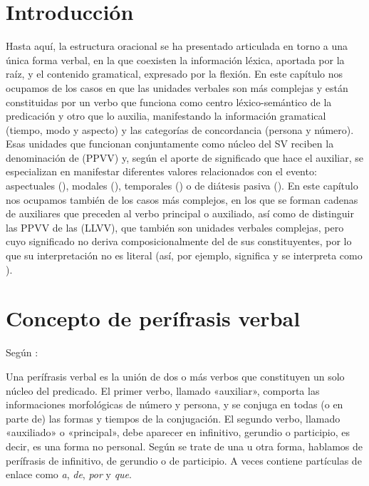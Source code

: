 
\section{Introducción}

Hasta aquí, la estructura oracional se ha presentado articulada en torno a una
única forma verbal, en la que coexisten la información léxica, aportada por la
raíz, y el contenido gramatical, expresado por la flexión. En este capítulo nos
ocupamos de los casos en que las unidades verbales son más complejas y están
constituidas por un verbo que funciona como centro léxico-semántico de la
predicación y otro que lo auxilia, manifestando la información gramatical
(tiempo, modo y aspecto) y las categorías de concordancia (persona y número).
Esas unidades que funcionan conjuntamente como núcleo del SV reciben la
denominación de  (PPVV) y, según el aporte de
significado que hace el auxiliar, se especializan en manifestar diferentes
valores relacionados con el evento: aspectuales (), modales (), temporales
() o de diátesis pasiva (). En este capítulo nos ocupamos también de los casos más complejos, en
los que se forman cadenas de auxiliares que preceden al verbo principal o
auxiliado, así como de distinguir las PPVV de las 
(LLVV), que también son unidades verbales complejas, pero cuyo significado no
deriva composicionalmente del de sus constituyentes, por lo que su
interpretación no es literal (así, por ejemplo,  significa
 y  se interpreta como ).

\section{Concepto de perífrasis verbal}\label{sec:11-concepto}

Según \textcite[3425]{gomeztorrego1999}:

\begin{cita}
Una perífrasis verbal es la unión de dos o más verbos que constituyen un solo
núcleo del predicado. El primer verbo, llamado «auxiliar», comporta las
informaciones morfológicas de número y persona, y se conjuga en todas (o en
parte de) las formas y tiempos de la conjugación. El segundo verbo, llamado
«auxiliado» o «principal», debe aparecer en infinitivo, gerundio o participio,
es decir, es una forma no personal. Según se trate de una u otra forma, hablamos
de perífrasis de infinitivo, de gerundio o de participio. A veces contiene
partículas de enlace como \textit{a}, \textit{de}, \textit{por} y \textit{que}.
\end{cita}

